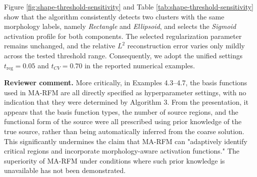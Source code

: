 \documentclass[11pt]{article}
\newcommand{\reviewer}[1]{\vspace{0.4em}\noindent\textbf{Reviewer comment.} #1}
\begin{document}
{\begin{table}[H]
    \centering
    \caption{Detailed threshold-sensitivity results for Example 4.5 with noise level $\delta=5\%$.}
    \label{tab:shape-threshold-sensitivity}
    \small
\end{table}
Figure \ref{fig:shape-threshold-sensitivity} and Table \ref{tab:shape-threshold-sensitivity} show that the algorithm consistently detects two clusters with the same morphology labels, namely \emph{Rectangle} and \emph{Ellipsoid}, and selects the \emph{Sigmoid} activation profile for both components. The selected regularization parameter remains unchanged, and the relative $L^2$ reconstruction error varies only mildly across the tested threshold range.
Consequently, we adopt the unified settings $t_{\text{reg}}=0.05$ and $t_{CV}=0.70$ in the reported numerical examples.}

\reviewer{More critically, in Examples 4.3–4.7, the basis functions used in MA-RFM are
all directly specified as hyperparameter settings, with no indication that they
were determined by Algorithm 3. From the presentation, it appears that the
basis function types, the number of source regions, and the functional form of
the source were all prescribed using prior knowledge of the true source, rather
than being automatically inferred from the coarse solution. This significantly
undermines the claim that MA-RFM can "adaptively identify critical regions
and incorporate morphology-aware activation functions." The superiority of MA-RFM under conditions where such prior knowledge is unavailable has not
been demonstrated.}
\end{document}
